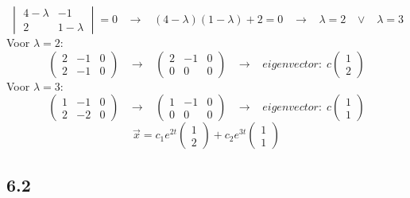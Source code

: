 \documentclass[11pt]{article}
\begin{document}
\[
\begin{vmatrix}
4-\lambda & -1 \\
2 & 1-\lambda
\end{vmatrix}
=0
\;\;\;\longrightarrow\;\;\;
(4-\lambda)(1-\lambda)+2=0
\;\;\;\longrightarrow\;\;\;
\lambda = 2 \;\;\;\vee\;\;\;\lambda = 3
\]
Voor $\lambda = 2$: 
\[
\left(
\begin{array}{cc|c}
2 & -1 & 0 \\
2 & -1 & 0
\end{array}
\right)
\;\;\;\longrightarrow\;\;\;
\left(
\begin{array}{cc|c}
2 & -1 & 0 \\
0 & 0 & 0
\end{array}
\right)
\;\;\;\longrightarrow\;\;\;
eigenvector:\;
c
\begin{pmatrix}
1\\2
\end{pmatrix}
\]
Voor $\lambda = 3$: 
\[
\left(
\begin{array}{cc|c}
1 & -1 & 0 \\
2 & -2 & 0
\end{array}
\right)
\;\;\;\longrightarrow\;\;\;
\left(
\begin{array}{cc|c}
1 & -1 & 0 \\
0 & 0 & 0
\end{array}
\right)
\;\;\;\longrightarrow\;\;\;
eigenvector:\;
c
\begin{pmatrix}
1\\1
\end{pmatrix}
\]
\[
\vec{x} = c_1e^{2t}\begin{pmatrix}
1\\2
\end{pmatrix}+c_2e^{3t}\begin{pmatrix}
1\\1
\end{pmatrix}
\]

\subsection*{6.2}
\end{document}
